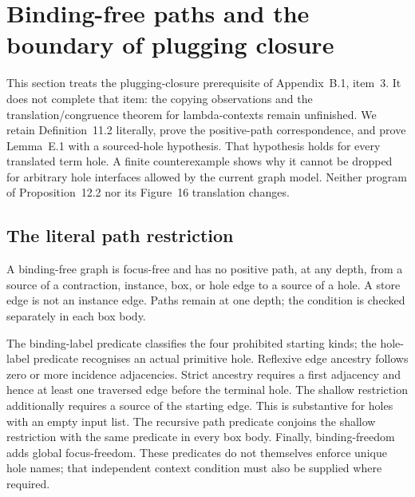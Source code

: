 \clearpage
\section{Binding-free paths and the boundary of plugging closure}
\label{sec:copying-binding}
This section treats the plugging-closure prerequisite of Appendix~B.1,
item~3. It does not complete that item: the copying observations and the
translation/congruence theorem for lambda-contexts remain unfinished.
We retain Definition~11.2 literally, prove the positive-path correspondence,
and prove Lemma~E.1 with a sourced-hole hypothesis. That hypothesis holds
for every translated term hole. A finite counterexample shows why it cannot
be dropped for arbitrary hole interfaces allowed by the current graph model.
Neither program of Proposition~12.2 nor its Figure~16 translation changes.

\subsection{The literal path restriction}
A binding-free graph is focus-free and has no positive path, at any depth,
from a source of a contraction, instance, box, or hole edge to a source of
a hole. A store edge is not an instance edge. Paths remain at one depth;
the condition is checked separately in each box body.


The binding-label predicate classifies the four prohibited starting kinds;
the hole-label predicate recognises an actual primitive hole. Reflexive
edge ancestry follows zero or more incidence adjacencies. Strict ancestry
requires a first adjacency and hence at least one traversed edge before the
terminal hole. The shallow restriction additionally requires a source of
the starting edge. This is substantive for holes with an empty input list.
The recursive path predicate conjoins the shallow restriction with the
same predicate in every box body. Finally, binding-freedom adds global
focus-freedom. These predicates do not themselves enforce unique hole names;
that independent context condition must also be supplied where required.









